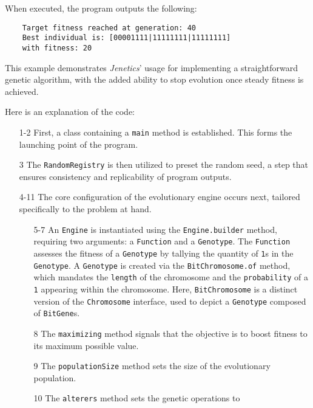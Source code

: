   When executed, the program outputs the following:

  \begin{verbatim}
    Target fitness reached at generation: 40
    Best individual is: [00001111|11111111|11111111]
    with fitness: 20
  \end{verbatim}

  This example demonstrates \textit{Jenetics}' usage for implementing a 
  straightforward
  genetic algorithm, with the added ability to stop evolution once steady
  fitness is achieved.

  Here is an explanation of the code:

  \begin{enumerate}
    \item[1-2] First, a class containing a \texttt{main} method is established.
      This forms the launching point of the program.
    \item[3] The \texttt{RandomRegistry} is then utilized to preset the random 
      seed, a step that ensures consistency and replicability of program 
      outputs.
    \item[4-11] The core configuration of the evolutionary engine occurs next, 
      tailored specifically to the problem at hand.
      \begin{enumerate}
        \item[5-7] An \texttt{Engine} is instantiated using the 
          \texttt{Engine.builder} method, requiring two arguments: a 
          \texttt{Function} and a \texttt{Genotype}.
          The \texttt{Function} assesses the fitness of a \texttt{Genotype} by 
          tallying the quantity of \texttt{1}s in the \texttt{Genotype}.
          A \texttt{Genotype} is created via the \texttt{BitChromosome.of} 
          method, which mandates the \texttt{length} of the chromosome and the 
          \texttt{probability} of a \texttt{1} appearing within the chromosome.
          Here, \texttt{BitChromosome} is a distinct version of the 
          \texttt{Chromosome} interface, used to depict a \texttt{Genotype} 
          composed of \texttt{BitGene}s.
        \item[8] The \texttt{maximizing} method signals that the objective is 
          to boost fitness to its maximum possible value.
        \item[9] The \texttt{populationSize} method sets the size of the 
          evolutionary population.
        \item[10] The \texttt{alterers} method sets the genetic operations to 

\end{enumerate}
\end{enumerate}
